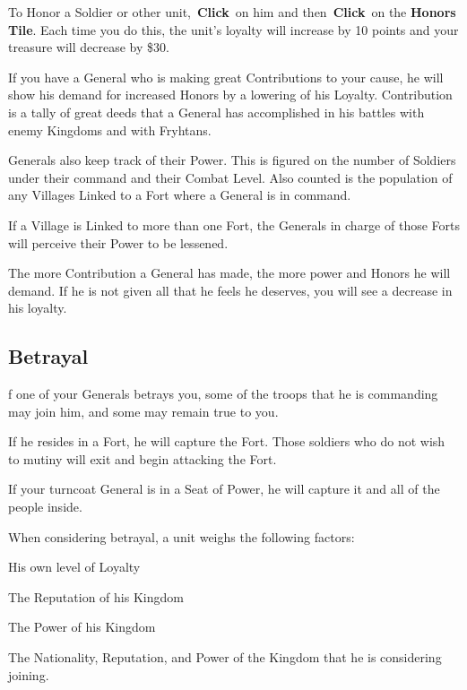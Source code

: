 To Honor a Soldier or other unit, \textbf{Click} on him and then \textbf{Click} on the \textbf{Honors Tile}. Each time you do this, the unit’s loyalty will increase by 10 points and your treasure will decrease by \$30.

If you have a General who is making great Contributions to your cause, he will show his demand for increased Honors by a lowering of his Loyalty. Contribution is a tally of great deeds that a General has accomplished in his battles with enemy Kingdoms and with Fryhtans.

Generals also keep track of their Power. This is figured on the number of Soldiers under their command and their Combat Level. Also counted is the population of any Villages Linked to a Fort where a General is in command.

If a Village is Linked to more than one Fort, the Generals in charge of those Forts will perceive their Power to be lessened.

The more Contribution a General has made, the more power and Honors he will demand. If he is not given all that he feels he deserves, you will see a decrease in his loyalty.

\subsection{Betrayal}


f one of your Generals betrays you, some of the troops that he is commanding may join him, and some may remain true to you.

If he resides in a Fort, he will capture the Fort. Those soldiers who do not wish to mutiny will exit and begin attacking the Fort.

If your turncoat General is in a Seat of Power, he will capture it and all of the people inside.

When considering betrayal, a unit weighs the following factors:

\begin{changemargin}{.5cm}{0cm}
His own level of Loyalty

The Reputation of his Kingdom

The Power of his Kingdom

The Nationality, Reputation, and Power of the Kingdom that he is considering joining.
\end{changemargin}